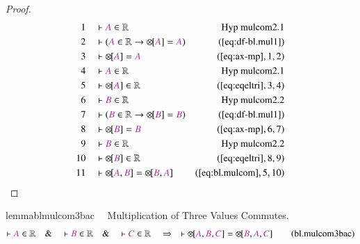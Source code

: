 \begin{proof}
\begin{align}
  1 &&  & \vdash \mc{A} \in \mathbb{R}&\text{Hyp~mulcom2.1}\notag%
  \\ 2 &&  & \vdash ( \mc{A} \in \mathbb{R} \rightarrow {\otimes\hspace{-1pt}[}
      \mc{A} ] = \mc{A}
      )&(\mbox{\ref{eq:df-bl.mul1}})\notag
  \\ 3 &&  & \vdash {\otimes\hspace{-1pt}[} \mc{A} ] =
      \mc{A}&(\mbox{\ref{eq:ax-mp}},1,2)\notag
  \\ 4 &&  & \vdash \mc{A} \in
      \mathbb{R}&\text{Hyp~mulcom2.1}\notag%
  \\ 5 &&  & \vdash {\otimes\hspace{-1pt}[} \mc{A} ] \in
      \mathbb{R}&(\mbox{\ref{eq:eqeltri}},3,4)\notag
  \\ 6 &&  & \vdash \mc{B} \in
      \mathbb{R}&\text{Hyp~mulcom2.2}\notag%
  \\ 7 &&  & \vdash ( \mc{B} \in \mathbb{R} \rightarrow {\otimes\hspace{-1pt}[}
      \mc{B} ] = \mc{B}
      )&(\mbox{\ref{eq:df-bl.mul1}})\notag
  \\ 8 &&  & \vdash {\otimes\hspace{-1pt}[} \mc{B} ] =
      \mc{B}&(\mbox{\ref{eq:ax-mp}},6,7)\notag
  \\ 9 &&  & \vdash \mc{B} \in
      \mathbb{R}&\text{Hyp~mulcom2.2}\notag%
  \\ 10 &&  & \vdash {\otimes\hspace{-1pt}[} \mc{B} ] \in
      \mathbb{R}&(\mbox{\ref{eq:eqeltri}},8,9)\notag
  \\ 11 &&  & \vdash {\otimes\hspace{-1pt}[} \mc{A} , \mc{B} ] =
      {\otimes\hspace{-1pt}[} \mc{B} , \mc{A}
      ]&(\mbox{\ref{eq:bl.mulcom}},5,10)\notag
\end{align}
\end{proof}

\begin{restatable}{lemma}{blmulcom3bac}~~ Multiplication of Three Values
Commutes.
\begin{align}
\vdash \mc{A} \in \mathbb{R}\quad\&\quad \vdash \mc{B} \in
    \mathbb{R}\quad\&\quad \vdash \mc{C} \in \mathbb{R}\quad\Rightarrow\quad
    \vdash {\otimes\hspace{-1pt}[} \mc{A} , \mc{B} , \mc{C} ] =
    {\otimes\hspace{-1pt}[} \mc{B} , \mc{A} , \mc{C}
    ]\label{eq:bl.mulcom3bac}\tag{bl.mulcom3bac}
\end{align}
\end{restatable}

